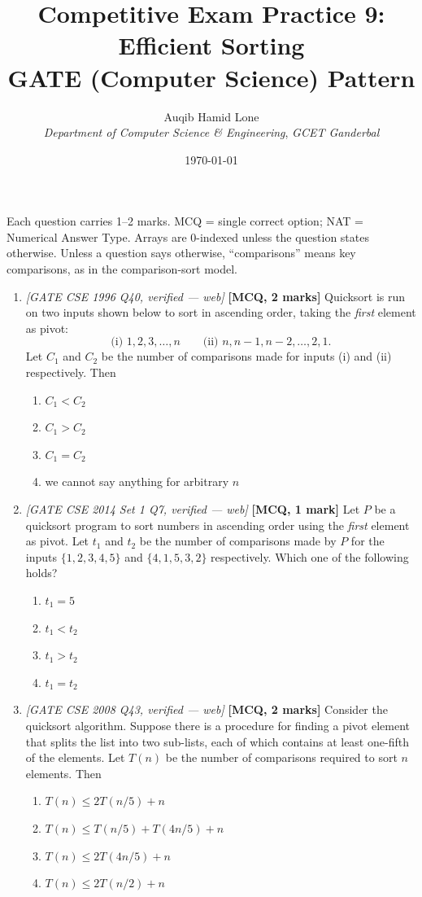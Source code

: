 \documentclass[11pt]{article}
\title{Competitive Exam Practice 9: Efficient Sorting\\\large GATE (Computer Science) Pattern}
\author{Auqib Hamid Lone\\[0.3em]
  \emph{Department of Computer Science \& Engineering}, \emph{GCET Ganderbal}}
\date{\today}
\begin{document}
\maketitle

\noindent Each question carries 1--2 marks. MCQ = single correct option; NAT = Numerical Answer Type. Arrays are 0-indexed unless the question states otherwise. Unless a question says otherwise, ``comparisons'' means key comparisons, as in the comparison-sort model.

\begin{enumerate}
\item[\textbf{Q1}] \textit{[GATE CSE 1996 Q40, verified --- web]} \textbf{[MCQ, 2 marks]} Quicksort is run on two inputs shown below to sort in ascending order, taking the \emph{first} element as pivot:
\[
\text{(i) } 1,2,3,\dots,n \qquad \text{(ii) } n,n-1,n-2,\dots,2,1.
\]
Let $C_1$ and $C_2$ be the number of comparisons made for inputs (i) and (ii) respectively. Then
\begin{enumerate}
  \item[(A)] $C_1 < C_2$
  \item[(B)] $C_1 > C_2$
  \item[(C)] $C_1 = C_2$
  \item[(D)] we cannot say anything for arbitrary $n$
\end{enumerate}

\item[\textbf{Q2}] \textit{[GATE CSE 2014 Set 1 Q7, verified --- web]} \textbf{[MCQ, 1 mark]} Let $P$ be a quicksort program to sort numbers in ascending order using the \emph{first} element as pivot. Let $t_1$ and $t_2$ be the number of comparisons made by $P$ for the inputs $\{1,2,3,4,5\}$ and $\{4,1,5,3,2\}$ respectively. Which one of the following holds?
\begin{enumerate}
  \item[(A)] $t_1 = 5$
  \item[(B)] $t_1 < t_2$
  \item[(C)] $t_1 > t_2$
  \item[(D)] $t_1 = t_2$
\end{enumerate}

\item[\textbf{Q3}] \textit{[GATE CSE 2008 Q43, verified --- web]} \textbf{[MCQ, 2 marks]} Consider the quicksort algorithm. Suppose there is a procedure for finding a pivot element that splits the list into two sub-lists, each of which contains at least one-fifth of the elements. Let $T(n)$ be the number of comparisons required to sort $n$ elements. Then
\begin{enumerate}
  \item[(A)] $T(n) \le 2T(n/5) + n$
  \item[(B)] $T(n) \le T(n/5) + T(4n/5) + n$
  \item[(C)] $T(n) \le 2T(4n/5) + n$
  \item[(D)] $T(n) \le 2T(n/2) + n$
\end{enumerate}


\end{enumerate}
\end{document}
